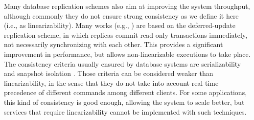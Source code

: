 Many database replication schemes also aim at improving the system throughput, although commonly they do not ensure strong consistency as we define it here (i.e., as linearizability). Many works (e.g., \cite{sciascia2012sdur, SousaOMP01, chun96dur, kobus2013hybrid}) are based on the deferred-update replication scheme, in which replicas commit read-only transactions immediately, not necessarily synchronizing with each other. This provides a significant improvement in performance, but allows non-linearizable executions to take place. The consistency criteria usually ensured by database systems are serializability \cite{BHG87} and snapshot isolation \cite{LinKJPA09}. Those criteria can be considered weaker than linearizability, in the sense that they do not take into account real-time precedence of different commands among different clients. For some applications, this kind of consistency is good enough, allowing the system to scale better, but services that require linearizability cannot be implemented with such techniques.

